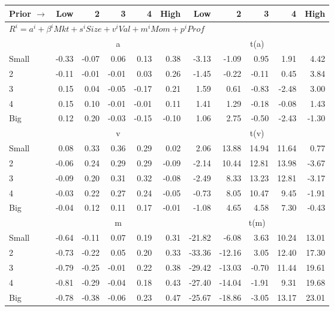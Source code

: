 
\begin{tabular}{lrrrrrrrrrr}
  \toprule
    
    Prior $\rightarrow$ & Low & 2 & 3 & 4 & High & Low & 2 & 3 & 4 & High  \\ 
  \midrule
  \multicolumn{11}{l}{$R^i=a^i+\beta^iMkt+s^iSize+v^iVal+m^iMom+p^iProf$}  \\
  
     & \multicolumn{5}{c}{a} & \multicolumn{5}{c}{t(a)}   \\
     \cmidrule(r){2-6} \cmidrule(r){7-11} 
    Small  & -0.33  & -0.07  & 0.06  & 0.13  & 0.38  & -3.13  & -1.09  & 0.95  & 1.91  & 4.42   \\
    2  & -0.11  & -0.01  & -0.01  & 0.03  & 0.26  & -1.45  & -0.22  & -0.11  & 0.45  & 3.84   \\
    3  & 0.15  & 0.04  & -0.05  & -0.17  & 0.21  & 1.59  & 0.61  & -0.83  & -2.48  & 3.00   \\
    4  & 0.15  & 0.10  & -0.01  & -0.01  & 0.11  & 1.41  & 1.29  & -0.18  & -0.08  & 1.43   \\
    Big  & 0.12  & 0.20  & -0.03  & -0.15  & -0.10  & 1.06  & 2.75  & -0.50  & -2.43  & -1.30   \\
    
  
     & \multicolumn{5}{c}{v} & \multicolumn{5}{c}{t(v)}   \\
     \cmidrule(r){2-6} \cmidrule(r){7-11} 
    Small  & 0.08  & 0.33  & 0.36  & 0.29  & 0.02  & 2.06  & 13.88  & 14.94  & 11.64  & 0.77   \\
    2  & -0.06  & 0.24  & 0.29  & 0.29  & -0.09  & -2.14  & 10.44  & 12.81  & 13.98  & -3.67   \\
    3  & -0.09  & 0.20  & 0.31  & 0.32  & -0.08  & -2.49  & 8.33  & 13.23  & 12.81  & -3.17   \\
    4  & -0.03  & 0.22  & 0.27  & 0.24  & -0.05  & -0.73  & 8.05  & 10.47  & 9.45  & -1.91   \\
    Big  & -0.04  & 0.12  & 0.11  & 0.17  & -0.01  & -1.08  & 4.65  & 4.58  & 7.30  & -0.43   \\
    
  
     & \multicolumn{5}{c}{m} & \multicolumn{5}{c}{t(m)}   \\
     \cmidrule(r){2-6} \cmidrule(r){7-11} 
    Small  & -0.64  & -0.11  & 0.07  & 0.19  & 0.31  & -21.82  & -6.08  & 3.63  & 10.24  & 13.01   \\
    2  & -0.73  & -0.22  & 0.05  & 0.20  & 0.33  & -33.36  & -12.16  & 3.05  & 12.40  & 17.30   \\
    3  & -0.79  & -0.25  & -0.01  & 0.22  & 0.38  & -29.42  & -13.03  & -0.70  & 11.44  & 19.61   \\
    4  & -0.81  & -0.29  & -0.04  & 0.18  & 0.43  & -27.40  & -14.04  & -1.91  & 9.31  & 19.68   \\
    Big  & -0.78  & -0.38  & -0.06  & 0.23  & 0.47  & -25.67  & -18.86  & -3.05  & 13.17  & 23.01   \\
    

\end{tabular}
